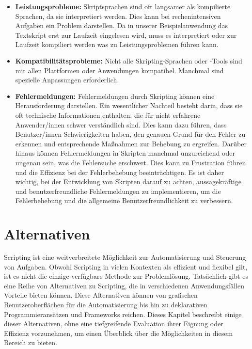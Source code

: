 \begin{itemize}
    \item \textbf{Leistungsprobleme:} Skriptsprachen sind oft langsamer als kompilierte Sprachen, 
    da sie interpretiert werden. Dies kann bei rechenintensiven Aufgaben ein Problem darstellen.
    Da in unserer Beispielanwendung das Textskript erst zur Laufzeit eingelesen wird, muss es interpretiert
    oder zur Laufzeit kompiliert werden was zu Leistungsproblemen führen kann.
    \item \textbf{Kompatibilitätsprobleme:} Nicht alle Skripting-Sprachen oder -Tools sind 
    mit allen Plattformen oder Anwendungen kompatibel. Manchmal sind spezielle 
    Anpassungen erforderlich.
    \item \textbf{Fehlermeldungen:} Fehlermeldungen durch Skripting können eine Herausforderung 
    darstellen. Ein wesentlicher Nachteil besteht darin, dass sie oft technische Informationen 
    enthalten, die für nicht erfahrene Anwender/innen schwer verständlich sind. 
    Dies kann dazu führen, dass Benutzer/innen Schwierigkeiten haben, den genauen Grund 
    für den Fehler zu erkennen und entsprechende Maßnahmen zur Behebung zu ergreifen. 
    Darüber hinaus können Fehlermeldungen in Skripten manchmal unzureichend oder ungenau sein, 
    was die Fehlersuche erschwert. Dies kann zu Frustration führen und die Effizienz 
    bei der Fehlerbehebung beeinträchtigen. Es ist daher wichtig, bei der Entwicklung 
    von Skripten darauf zu achten, aussagekräftige und benutzerfreundliche 
    Fehlermeldungen zu implementieren, um die Fehlerbehebung und die allgemeine 
    Benutzerfreundlichkeit zu verbessern.
\end{itemize}

\newpage

\section{Alternativen}

Scripting ist eine weitverbreitete Möglichkeit zur Automatisierung und Steuerung von Aufgaben. 
Obwohl Scripting in vielen Kontexten als effizient und flexibel gilt, ist es nicht die 
einzige verfügbare Methode zur Problemlösung. Tatsächlich gibt es eine Reihe von 
Alternativen zu Scripting, die in verschiedenen Anwendungsfällen Vorteile bieten können. 
Diese Alternativen können von grafischen Benutzeroberflächen für die Automatisierung bis 
hin zu deklarativen Programmieransätzen und Frameworks reichen. Dieses Kapitel beschreibt 
einige dieser Alternativen, ohne eine tiefgreifende Evaluation ihrer Eignung oder Effizienz 
vorzunehmen, um einen Überblick über die Möglichkeiten in diesem Bereich zu bieten.

